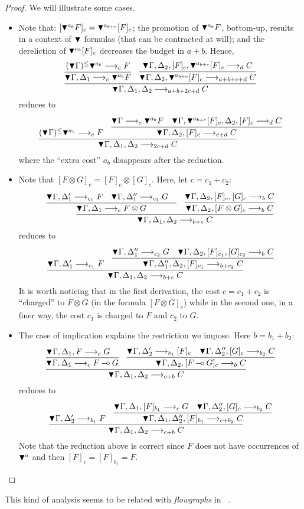 \begin{proof}
We will illustrate some cases. 
\begin{itemize}
 \item Note that: $[\blacktriangledown^{a_b}F]_c = \blacktriangledown^{a_{b+c}}[F]_c$;  the promotion of $\blacktriangledown^{a_b}F$, bottom-up, results in a context of 
 $\blacktriangledown^{}$ formulas (that can be contracted at will);
 and   the dereliction of $\blacktriangledown^{a_b}[F]_c$ decreases the budget in $a + b$. Hence, 
  \[
 \infer{\pnbang{}\Gamma,\Delta_1,\Delta_2 \lraS{a + b + 2c+d}{C}}{
   \infer{\pnbang{}\Gamma,\Delta_1 \lraS{c}\pnbang{a_b}F}{(\pnbang{}\Gamma)^\leqpn{a_b}\lraS{c}F}&
   \infer{\pnbang{}\Gamma, \Delta_2, \pnbang{a_{b+c}}[F]_c \lraS{a+b+c+d}C}{\pnbang{}\Gamma, \Delta_2, [F]_{c}, \pnbang{a_{b+c}}[F]_c \lraS{d}C}
 }
 \]
reduces to
\[
   \infer{\pnbang{}\Gamma,\Delta_1,\Delta_2 \lraS{2c+d}C}{
    \deduce{(\pnbang{}\Gamma)^\leqpn{a_b} \lraS{c}F}{} &
     \infer{\pnbang{}\Gamma,\Delta_2, [F]_{c}\lraS{c+d}C}{
      \deduce{\pnbang{}\Gamma \lraS{c} \pnbang{a_b}F}{}&
      \deduce{\pnbang{}\Gamma,\pnbang{a_{b+c}}[F]_c, \Delta_2, [F]_{c}\lraS{d}C}{}
     }
    }
 \]
where the  ``extra cost'' $a_b$ disappears after the reduction. 
 \item Note that $[F\otimes G]_c = [F]_{c} \otimes [G]_c$. Here, let $c = c_1 + c_2$: 
 \[
 \infer{\pnbang{}\Gamma,\Delta_1,\Delta_2 \lraS{b+c}C}{
  \infer{\pnbang{}\Gamma,\Delta_1 \lraS{c} F \otimes G}{
   \deduce{\pnbang{}\Gamma,\Delta_1' \lraS{c_1}F}{} &
   \deduce{\pnbang{}\Gamma,\Delta_1'' \lraS{c_2}G}{} &
  } &
  \infer{\pnbang{}\Gamma,\Delta_2, [F \otimes G]_{c} \lraS{b}C}{\pnbang{}\Gamma,\Delta_2, [F]_c, [G]_c \lraS{b}C}
 }
 \]
 reduces to
\[
 \infer{\pnbang{}\Gamma,\Delta_1,\Delta_2 \lraS{b  +c}C}{
  \deduce{\pnbang{}\Gamma,\Delta_1' \lraS{c_1} F}{} &
  \infer{\pnbang{}\Gamma,\Delta_1 '',\Delta_2, [F]_{c_1} \lraS{b+c_2}C}{
   \deduce{\pnbang{}\Gamma,\Delta_1'' \lraS{c_2} G}{} &
   \deduce{\pnbang{}\Gamma,\Delta_2,[F]_{c_1}, [G]_{c_2} \lraS{b}C}{}
  }
 }
 \]
 It is worth noticing that in the first derivation, the cost $c=c_1 + c_2$ is ``charged'' to  $F\otimes G$ 
(in the formula $[F \otimes G]_c$)
while in the second one, in a  finer way, the cost $c_1$ is charged to $F$ and $c_2$ to $G$. 
 \item The case of implication explains the restriction we impose. Here $b = b_1 + b_2$:
 \[
\infer{\pnbang{}\Gamma,\Delta_1,\Delta_2 \lraS{c + b}C }{
  \infer{\pnbang{}\Gamma,\Delta_1 \lraS{c} F\limp G}{
   \deduce{\pnbang{}\Gamma,\Delta_1,F  \lraS{c} G}{}&
   }&
   \infer{\pnbang{}\Gamma,\Delta_2, [F \limp G]_c \lraS{b }C }{
     \deduce{\pnbang{}\Gamma,\Delta_2' \lraS{b_1}[F]_{c}}{}&
     \deduce{\pnbang{}\Gamma,\Delta_2'', [G]_c\lraS{b_2} C}{}
   }
}
 \]
 reduces to 
 \[
 \infer{\pnbang{}\Gamma,\Delta_1,\Delta_2 \lraS{c + b} C}{
   \deduce{\pnbang{}\Gamma,\Delta_2' \lraS{b_1} F}{}&
   \infer{\pnbang{}\Gamma,\Delta_1,\Delta_2'', [F]_{b_1} \lraS{c + b_2}C}{
    \deduce{\pnbang{}\Gamma,\Delta_1, [F]_{b_1} \lraS{c} G}{} &
    \deduce{\pnbang{}\Gamma,\Delta_2'', [G]_{c} \lraS{b_2} C}{}
   }
 }
 \]
Note that the reduction above is correct since $F$ does not have 
occurrences of $\blacktriangledown^{a}$ and then  $[F]_c = [F]_{b_1}=F$. 
\end{itemize}
\end{proof}
This kind of analysis seems to be related with {\em flowgraphs} in \MELL~\cite{DBLP:journals/tcs/Strassburger03,DBLP:journals/tocl/StrassburgerG11}. 
%
 \label{sec:app}

